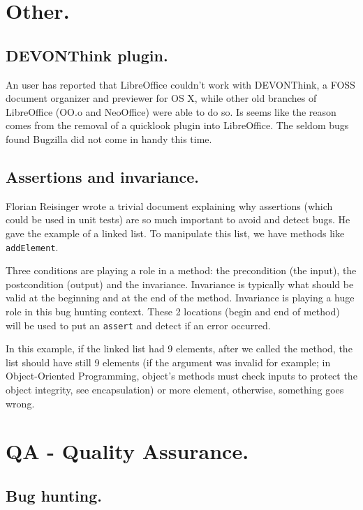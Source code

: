 \documentclass{article}
\begin{document}
\section{Other.}

\subsection{DEVONThink plugin.}

An user has reported that LibreOffice couldn't work with DEVONThink, a FOSS document organizer and previewer for OS X, while other old branches of LibreOffice (OO.o and NeoOffice) were able to do so. Is seems like the reason comes from the removal of a quicklook plugin into LibreOffice. The seldom bugs found Bugzilla did not come in handy this time\cite{quicklookPlugin}.

\subsection{Assertions and invariance.}

Florian Reisinger wrote a trivial document explaining why assertions (which could be used in unit tests) are so much important to avoid and detect bugs. He gave the example of a linked list. To manipulate this list, we have methods like \lstinline{addElement}.

Three conditions are playing a role in a method: the precondition (the input), the postcondition (output) and the invariance. Invariance is typically what should be valid at the beginning and at the end of the method. Invariance is playing a huge role in this bug hunting context. These 2 locations (begin and end of method) will be used to put an \lstinline{assert} and detect if an error occurred.

In this example, if the linked list had 9 elements, after we called the method, the list should have still 9 elements (if the argument was invalid for example; in Object-Oriented Programming, object's methods must check inputs to protect the object integrity, see encapsulation) or more element, otherwise, something goes wrong\cite{assertionsUnitTest}.



\section{QA - Quality Assurance.}

\subsection{Bug hunting.}
\end{document}

